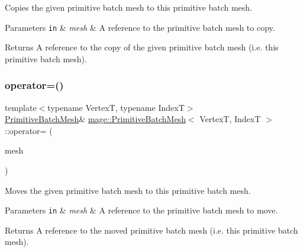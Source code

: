 Copies the given primitive batch mesh to this primitive batch mesh.


\begin{DoxyParams}[1]{Parameters}
\mbox{\tt in}  & {\em mesh} & A reference to the primitive batch mesh to copy. \\
\hline
\end{DoxyParams}
\begin{DoxyReturn}{Returns}
A reference to the copy of the given primitive batch mesh (i.\+e. this primitive batch mesh). 
\end{DoxyReturn}
\hypertarget{classmage_1_1_primitive_batch_mesh_a24e963ee76588da4a9c678fc48ca5294}{}\label{classmage_1_1_primitive_batch_mesh_a24e963ee76588da4a9c678fc48ca5294} 
\subsubsection{\texorpdfstring{operator=()}{operator=()}\hspace{0.1cm}{\footnotesize\ttfamily [2/2]}}
{\footnotesize\ttfamily template$<$typename VertexT, typename IndexT$>$ \\
\hyperlink{classmage_1_1_primitive_batch_mesh}{Primitive\+Batch\+Mesh}\& \hyperlink{classmage_1_1_primitive_batch_mesh}{mage\+::\+Primitive\+Batch\+Mesh}$<$ VertexT, IndexT $>$\+::operator= (\begin{DoxyParamCaption}\item[{\hyperlink{classmage_1_1_primitive_batch_mesh}{Primitive\+Batch\+Mesh}$<$ VertexT, IndexT $>$ \&\&}]{mesh }\end{DoxyParamCaption})\hspace{0.3cm}{\ttfamily [noexcept]}}

Moves the given primitive batch mesh to this primitive batch mesh.


\begin{DoxyParams}[1]{Parameters}
\mbox{\tt in}  & {\em mesh} & A reference to the primitive batch mesh to move. \\
\hline
\end{DoxyParams}
\begin{DoxyReturn}{Returns}
A reference to the moved primitive batch mesh (i.\+e. this primitive batch mesh). 
\end{DoxyReturn}
\hypertarget{classmage_1_1_primitive_batch_mesh_a05f64f7de034c5c5e29dc6bfb220e85e}{}\label{classmage_1_1_primitive_batch_mesh_a05f64f7de034c5c5e29dc6bfb220e85e} 
